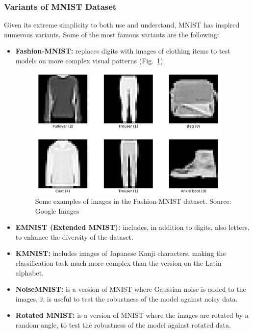\subsubsection{Variants of MNIST Dataset}
Given its extreme simplicity to both use and understand, MNIST has inspired numerous variants. Some of the most famous variants are the following:
\begin{itemize}[itemsep=0.1cm]
    \item \textbf{Fashion-MNIST:} replaces digits with images of clothing items to test models on more complex visual patterns (Fig.~\ref{fig:figure-4.1.4}).
    \begin{figure}[t]
		\centering
		\includegraphics[width=10cm]{figures/figure-4.1.4.png}
		\caption[Examples of Fashion-MNIST Images]{Some examples of images in the Fashion-MNIST dataset. Source: Google Images}
		\label{fig:figure-4.1.4}
	\end{figure}
	\item \textbf{EMNIST (Extended MNIST):} includes, in addition to digits, also letters, to enhance the diversity of the dataset.
    \item \textbf{KMNIST:} includes images of Japanese Kanji characters, making the classification task much more complex than the version on the Latin alphabet.
    \item \textbf{NoiseMNIST:} is a version of MNIST where Gaussian noise is added to the images, it is useful to test the robustness of the model against noisy data.
    \item \textbf{Rotated MNIST:} is a version of MNIST where the images are rotated by a random angle, to test the robustness of the model against rotated data.
\end{itemize}
% 

